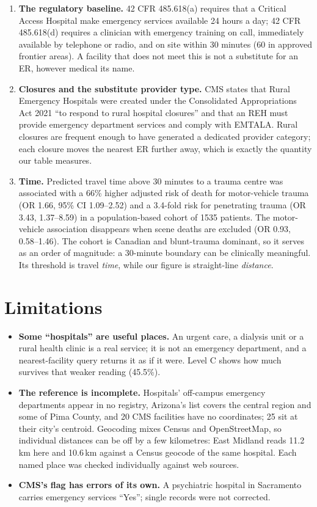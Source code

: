 \documentclass[a4paper]{article}
\begin{document}
\begin{enumerate}
\item \textbf{The regulatory baseline.} 42 CFR 485.618(a) requires that a Critical Access
Hospital make emergency services available 24 hours a day; 42 CFR 485.618(d) requires a
clinician with emergency training on call, immediately available by telephone or radio, and on
site within 30 minutes (60 in approved frontier areas). A facility
that does not meet this is not a substitute for an ER, however medical its name.
\item \textbf{Closures and the substitute provider type.} CMS states that Rural Emergency
Hospitals were created under the Consolidated Appropriations Act 2021 ``to respond to rural
hospital closures'' and that an REH must provide emergency department services and comply with
EMTALA. Rural closures are frequent enough to have generated a dedicated provider category;
each closure moves the nearest ER further away, which is exactly the quantity our table
measures.
\item \textbf{Time.} Predicted travel time above 30 minutes to a trauma centre was associated
with a 66\% higher adjusted risk of death for motor-vehicle trauma (OR 1.66, 95\% CI
1.09--2.52) and a 3.4-fold risk for penetrating trauma (OR 3.43, 1.37--8.59) in a
population-based cohort of \num{1535} patients. The motor-vehicle association disappears when
scene deaths are excluded (OR 0.93, 0.58--1.46). The cohort is Canadian and blunt-trauma dominant,
so it serves as an order of magnitude: a 30-minute boundary can be clinically meaningful. Its threshold is
travel \emph{time}, while our figure is straight-line \emph{distance}.
\end{enumerate}

\section{Limitations}

\begin{itemize}
\item \textbf{Some ``hospitals'' are useful places.} An urgent care, a dialysis unit or a rural health clinic
is a real service; it is not an emergency department, and a nearest-facility query returns it as if it were.
Level C shows how much survives that weaker reading (45.5\%).
\item \textbf{The reference is incomplete.} Hospitals' off-campus emergency departments appear in
no registry, Arizona's list covers the central region and some of Pima County, and 20 CMS facilities
have no coordinates; 25 sit at their city's centroid. Geocoding mixes Census and OpenStreetMap, so individual
distances can be off by a few kilometres: East Midland reads 11.2\,km here and 10.6\,km against a Census geocode
of the same hospital. Each named place was checked individually against web sources.
\item \textbf{CMS's flag has errors of its own.} A psychiatric hospital in Sacramento carries
emergency services ``Yes''; single records were not corrected.
\end{itemize}
\end{document}
